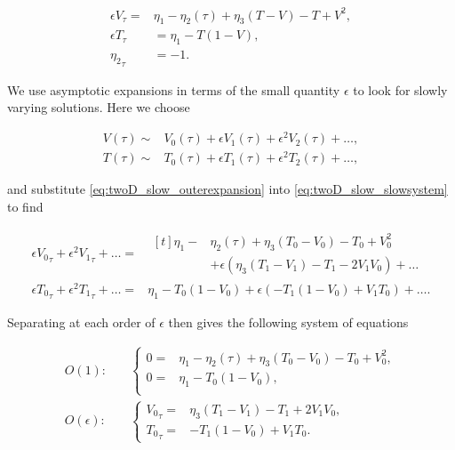 \begin{equation}\label{eq:twoD_slow_slowsystem}
\begin{aligned}
\epsilon V_\tau =&\eta_1-\eta_2(\tau)+\eta_3(T-V)-T+V^2, \\
\epsilon T_\tau & = \eta_1-T(1-V), \\
 {\eta_2}_\tau & = -1.
\end{aligned}
\end{equation}

We use asymptotic expansions in terms of the small quantity $\epsilon$ to look for slowly varying solutions. Here we choose

\begin{equation}\label{eq:twoD_slow_outerexpansion}
\begin{aligned}
V(\tau)\sim &V_0(\tau)+\epsilon V_1(\tau)+\epsilon^2 V_2(\tau)+\ldots,\\
T(\tau)\sim & T_0(\tau)+\epsilon T_1(\tau)+\epsilon^2 T_2(\tau)+\ldots,
\end{aligned}
\end{equation}

and substitute \eqref{eq:twoD_slow_outerexpansion} into \eqref{eq:twoD_slow_slowsystem} to find

\begin{equation*}
\begin{aligned}
 \epsilon{V_0}_\tau+\epsilon^2{V_1}_\tau+\ldots =&\begin{aligned}[t]
\eta_1-&\eta_2(\tau)+\eta_3(T_0-V_0)-T_0+V_0^2\\
&+\epsilon(\eta_3(T_1-V_1)-T_1-2V_1V_0)+\ldots
\end{aligned}\\
\epsilon{T_0}_\tau+\epsilon^2{T_1}_\tau+\ldots=&\eta_1-T_0(1-V_0)+\epsilon(-T_1(1-V_0)+V_1T_0)+\ldots.
\end{aligned}
\end{equation*}

Separating at each order of $\epsilon$ then gives the following system of equations

\begin{align}
\label{eq:twoD_slow_outerO1}
O(1):\quad & \begin{cases}
	0 =& \eta_1-\eta_2(\tau)+\eta_3(T_0-V_0)-T_0+V_0^2 , \\
	0 =& \eta_1-T_0(1-V_0),\\
\end{cases}\\
\label{eq:twoD_slow_outerO2}
O(\epsilon):\quad & \begin{cases}
	{V_0}_\tau = & \eta_3(T_1-V_1)-T_1+2V_1V_0,\\
	{T_0}_\tau =& -T_1(1-V_0)+V_1T_0.
\end{cases}
\end{align}

